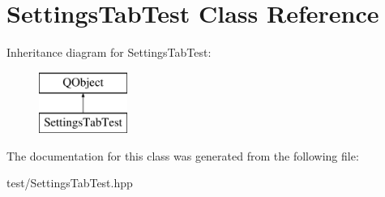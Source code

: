 \hypertarget{classSettingsTabTest}{\section{Settings\+Tab\+Test Class Reference}
\label{classSettingsTabTest}
}
Inheritance diagram for Settings\+Tab\+Test\+:\begin{figure}[H]
\begin{center}
\leavevmode
\includegraphics[height=2.000000cm]{classSettingsTabTest}
\end{center}
\end{figure}


The documentation for this class was generated from the following file\+:\begin{DoxyCompactItemize}
\item 
test/Settings\+Tab\+Test.\+hpp\end{DoxyCompactItemize}
